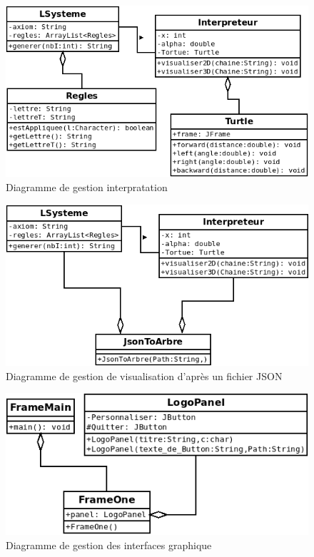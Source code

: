     \begin{figure}[h]
      \begin{center}
         \includegraphics[scale=\umlscale]{diagrammes/interpretation.png}
      \end{center}
      \caption{Diagramme de gestion interpratation }
      \label{fig:interprete}
    \end{figure}
    
     \begin{figure}[h]
      \begin{center}
         \includegraphics[scale=\umlscale]{diagrammes/json.png}
      \end{center}
        \caption{Diagramme de gestion de visualisation d'après un fichier JSON }
        \label{fig:json}
    \end{figure}
    
     \begin{figure}[!h]
      \begin{center}
         \includegraphics[scale=\umlscale]{diagrammes/graphique.png}
      \end{center}
        \caption{Diagramme de gestion des interfaces graphique }
         \label{fig:graphique}
    \end{figure}
    
